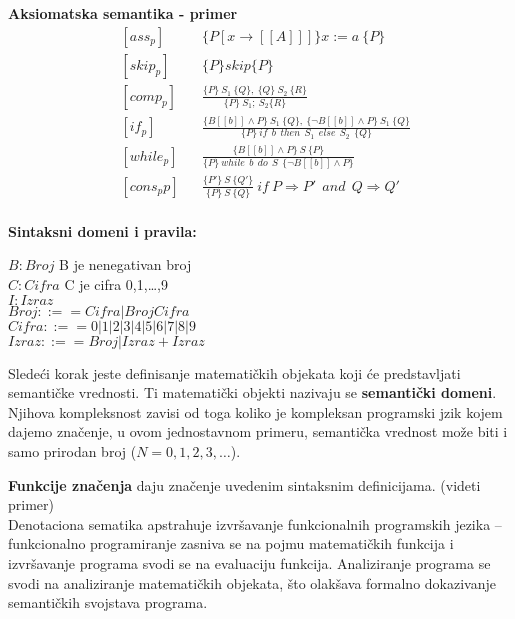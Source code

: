 \documentclass[../main.tex]{subfiles}
\begin{document}
\begin{boxprimer}
{\bf Aksiomatska semantika - primer}\\
\begin{align*}
&[ass_{p}] & &\{P[x \rightarrow [\![A]\!] ]\} x:= a\ \{P\} \\
&[skip_{p}] &  &  \{P\} skip  \{P\}  \\
&[comp_{p}] & & \frac{\{P\}\ S_1\  \{Q\},\  \{Q\}\ S_2\  \{R\}}{ \{P\}\ S_1;\ S_2 \{R\}} \\
&[if_{p}] & & \frac{ \{B[\![b]\!] \wedge P \}\ S_1\  \{Q\},\  \{\neg B[\![b]\!] \wedge P\}\ S_1\  \{Q\} }
			{ \{P\}\ if\ \ b\ \ then\ \ S_1\ \ else\ \ S_2\ \  \{Q\}  }  \\
&[while_{p}] & & \frac{ \{B[\![b]\!] \wedge P \}\ S\ \{P\} }
			{ \{P\}\ while\ \ b\ \ do\ \ S\ \ \{\neg B[\![b]\!] \wedge P\}  } \\
&[cons_{p}p] & & \frac{\{P'\}\ S\ \{Q'\}}{\{P\} \ S\ \{Q\}}\ if\ P\Rightarrow P'\ \ and\ \ Q \Rightarrow Q'\\
\end{align*}
\end{boxprimer}

\pagebreak

\begin{multicols}{2}
	\begin{boxprimer}
	{\bf Sintaksni domeni i pravila:}
	
	$B:Broj$  \tab B je nenegativan broj\\
	$C:Cifra$ \tab C je cifra 0,1,\ldots,9\\
	$I:Izraz$\\
	$Broj::== Cifra|BrojCifra$\\
	$Cifra::== 0|1|2|3|4|5|6|7|8|9$\\
	$Izraz::== Broj|Izraz+Izraz$
	\end{boxprimer}
	\columnbreak
	Sledeći korak jeste definisanje matematičkih objekata koji će predstavljati semantičke vrednosti. Ti matematički objekti nazivaju se {\bf semantički domeni}. Njihova kompleksnost zavisi od toga koliko je kompleksan programski jzik kojem dajemo značenje, u ovom jednostavnom primeru, semantička vrednost može biti i samo prirodan broj ($N=0,1,2,3,\ldots$). 
\end{multicols}
{\bf Funkcije značenja} daju značenje uvedenim sintaksnim definicijama. (videti primer)
\\
	Denotaciona sematika apstrahuje izvršavanje funkcionalnih programskih jezika -- funkcionalno programiranje zasniva se na pojmu matematičkih funkcija i izvršavanje programa svodi se na evaluaciju funkcija. Analiziranje programa se svodi na analiziranje matematičkih objekata, što olakšava formalno dokazivanje semantičkih svojstava programa. 
	
\end{document}
